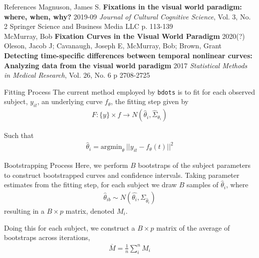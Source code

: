 \documentclass{beamer}
\newcommand{\code}[1]{\texttt{#1}}
\begin{document}
%
%

\begin{frame}{References}
Magnuson, James S. \textbf{Fixations in the visual world paradigm: where, when, why?} 2019-09 \textit{Journal of Cultural Cognitive Science}, Vol. 3, No. 2 Springer  Science and Business Media LLC p. 113-139 \newline \\

McMurray, Bob \textbf{Fixation Curves in the Visual World Paradigm} 2020(?) \newline \\

Oleson, Jacob J; Cavanaugh, Joseph E, McMurray, Bob; Brown, Grant \textbf{Detecting time-specific differences between temporal nonlinear curves: Analyzing data from the visual world paradigm} 2017 \textit{Statistical Methods in Medical Research}, Vol. 26, No. 6 p 2708-2725 \newline \\
\end{frame}

\begin{frame}{Fitting Process}
The current method employed by \code{bdots} is to fit for each observed subject, $y_{it}$, an underlying curve $f_{\theta}$, the fitting step given by 
  \begin{align*}
  F: \{y\} \times f \rightarrow N \left(\hat{\theta}_i, \hat{\Sigma}_{\theta_i} \right)
  \end{align*}

Such that
  \begin{align*}
  \hat{\theta}_i = \text{argmin}_{\theta} \  ||y_{it} - f_{\theta}(t)||^2
  \end{align*}

\end{frame}


\begin{frame}{Bootstrapping Process}
Here, we perform $B$ bootstraps of the subject parameters to construct bootstrapped curves and confidence intervals. Taking parameter estimates from the fitting step, for each subject we draw $B$ samples of $\hat{\theta}_i$, where 
\begin{align*}
\hat{\theta}_{ib} \sim N \left(\hat{\theta_i},  \Sigma_{\hat{\theta}_i} \right)
\end{align*}
resulting in a $B\times p$ matrix, denoted $M_i$. \newline 

Doing this for each subject, we construct a $B\times p$ matrix of the average of bootstraps across iterations, 
\begin{align*}
\overline{M} = \frac1n \sum_{i}^n M_i
\end{align*}
\end{frame}
\end{document}

